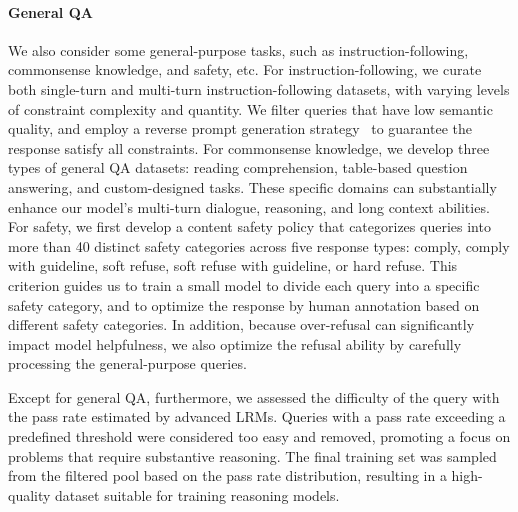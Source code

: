 

\noindent\paragraph{General QA}
We also consider some general-purpose tasks, such as instruction-following, commonsense knowledge, and safety, etc. 
For instruction-following, we curate both single-turn and multi-turn instruction-following datasets, with varying levels of constraint complexity and quantity. 
We filter queries that have low semantic quality, and employ a reverse prompt generation strategy~\citep{femepid2024gradual} to guarantee the response satisfy all constraints.
For commonsense knowledge, we develop three types of general QA datasets: reading comprehension, table-based question answering, and custom-designed tasks. 
These specific domains can substantially enhance our model's multi-turn dialogue, reasoning, and long context abilities. 
For safety, we first develop a content safety policy that categorizes queries into more than 40 distinct safety categories across five response types: comply, comply with guideline, soft refuse, soft refuse with guideline, or hard refuse.
This criterion guides us to train a small model to divide each query into a specific safety category, and to optimize the response by human annotation based on different safety categories.
In addition, because over-refusal can significantly impact model helpfulness, we also optimize the refusal ability by carefully processing the general-purpose queries.


Except for general QA, furthermore, we assessed the difficulty of the query with the pass rate estimated by advanced LRMs.
Queries with a pass rate exceeding a predefined threshold were considered too easy and removed, promoting a focus on problems that require substantive reasoning. 
The final training set was sampled from the filtered pool based on the pass rate distribution, resulting in a high-quality dataset suitable for training reasoning models.


